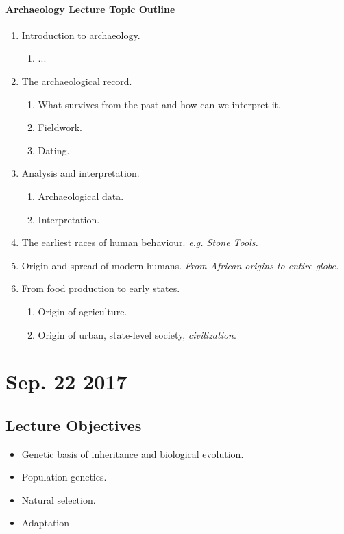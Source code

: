 \documentclass{article}
\begin{document}
	\paragraph{Archaeology Lecture Topic Outline}
	\begin{enumerate}
		\item Introduction to archaeology.
		\begin{enumerate}
			\item ...
		\end{enumerate}
		\item The archaeological record.
		\begin{enumerate}
			\item What survives from the past and how can we interpret it.
			\item Fieldwork.
			\item Dating. 
		\end{enumerate}
		\item Analysis and interpretation.
		\begin{enumerate}
			\item Archaeological data.
			\item Interpretation.
		\end{enumerate}
		\item The earliest races of human behaviour. \emph{e.g. Stone Tools.}
		\item Origin and spread of modern humans. \emph{From African origins to entire globe.}
		\item From food production to early states.
		\begin{enumerate}
			\item Origin of agriculture.
			\item Origin of urban, state-level society, \emph{civilization}.
		\end{enumerate}
	\end{enumerate}
	\section{Sep. 22 2017}
	\subsection{Lecture Objectives}
	\begin{enumerate}
		\begin{itemize}
			\item Genetic basis of inheritance and biological evolution.
			\item Population genetics.
			\item Natural selection.
			\item Adaptation	
		\end{itemize}
	\end{enumerate}
\end{document}
